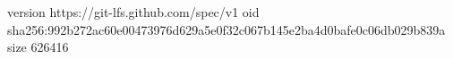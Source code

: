 version https://git-lfs.github.com/spec/v1
oid sha256:992b272ac60e00473976d629a5e0f32c067b145e2ba4d0bafe0c06db029b839a
size 626416
